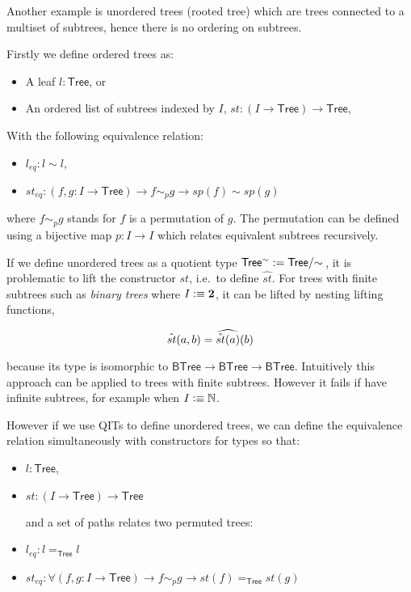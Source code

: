 Another example is unordered trees (rooted tree) which are trees connected to a multiset of subtrees, hence there is no ordering on subtrees.

Firstly we define ordered trees as:

\begin{itemize}
\item A leaf $l: \mathsf{Tree}$, or
\item An ordered list of subtrees indexed by $I$, $st : (I \rightarrow \mathsf{Tree}) \rightarrow \mathsf{Tree}$,
\end{itemize}

With the following equivalence relation:

\begin{itemize}
\item $l_{eq} : l \sim l$,
\item $st_{eq} : (f , g : I \to \mathsf{Tree}) \to f \sim_{p} g \to sp(f) \sim sp(g)$
\end{itemize}

where $f \sim_{p} g$ stands for $f$ is a permutation of $g$. The permutation can be defined using a bijective map $p : I \to I$ which relates equivalent subtrees recursively.


If we define unordered trees as a quotient type $\mathsf{Tree^{\sim}} := \qset{\mathsf{Tree}}$, 
it is problematic to lift the constructor $st$, i.e.\ to define $\hat{st}$.
For trees with finite subtrees such as \emph{binary trees} where $I \vcentcolon\equiv \mathbf{2}$, it can be lifted by nesting lifting functions,

$$\hat{st}(a,b) = \widehat{\hat{st}(a)}(b)$$

because its type is isomorphic to $\mathsf{BTree} \rightarrow \mathsf{BTree} \rightarrow \mathsf{BTree}$.
Intuitively this approach can be applied to trees with finite subtrees. However it fails if have infinite subtrees, for example when $I \vcentcolon\equiv \mathbb{N}$.

However if we use QITs to define unordered trees, we can define the equivalence relation simultaneously with constructors for types so that:

\begin{itemize}
\item $l: \mathsf{Tree}$, 
\item $st : (I \rightarrow \mathsf{Tree}) \rightarrow \mathsf{Tree}$

and a set of paths relates two permuted trees:

\item $l_{eq} : l  =_{\mathsf{Tree}} l $

\item$st_{eq} : \forall (f, g : I \to \mathsf{Tree}) \rightarrow  f \sim_{p} g \rightarrow  st(f) =_{\mathsf{Tree}} st(g)$
\end{itemize}

